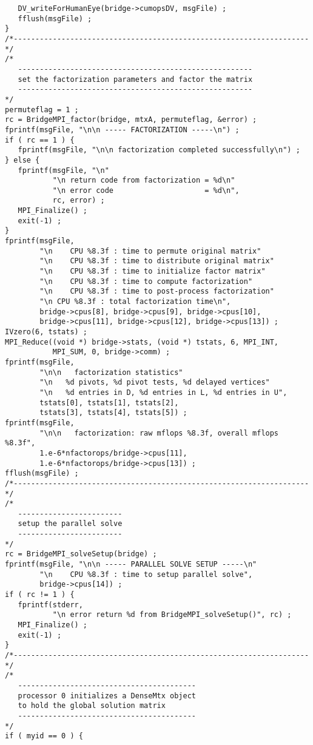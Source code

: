 \begin{verbatim}
   DV_writeForHumanEye(bridge->cumopsDV, msgFile) ;
   fflush(msgFile) ;
}
/*--------------------------------------------------------------------*/
/*
   ------------------------------------------------------
   set the factorization parameters and factor the matrix
   ------------------------------------------------------
*/
permuteflag = 1 ;
rc = BridgeMPI_factor(bridge, mtxA, permuteflag, &error) ;
fprintf(msgFile, "\n\n ----- FACTORIZATION -----\n") ;
if ( rc == 1 ) {
   fprintf(msgFile, "\n\n factorization completed successfully\n") ;
} else {
   fprintf(msgFile, "\n"
           "\n return code from factorization = %d\n"
           "\n error code                     = %d\n",
           rc, error) ;
   MPI_Finalize() ;
   exit(-1) ;
}
fprintf(msgFile, 
        "\n    CPU %8.3f : time to permute original matrix"
        "\n    CPU %8.3f : time to distribute original matrix" 
        "\n    CPU %8.3f : time to initialize factor matrix" 
        "\n    CPU %8.3f : time to compute factorization"
        "\n    CPU %8.3f : time to post-process factorization"
        "\n CPU %8.3f : total factorization time\n",
        bridge->cpus[8], bridge->cpus[9], bridge->cpus[10],
        bridge->cpus[11], bridge->cpus[12], bridge->cpus[13]) ;
IVzero(6, tstats) ;
MPI_Reduce((void *) bridge->stats, (void *) tstats, 6, MPI_INT,
           MPI_SUM, 0, bridge->comm) ;
fprintf(msgFile,
        "\n\n   factorization statistics"
        "\n   %d pivots, %d pivot tests, %d delayed vertices"
        "\n   %d entries in D, %d entries in L, %d entries in U",
        tstats[0], tstats[1], tstats[2], 
        tstats[3], tstats[4], tstats[5]) ;
fprintf(msgFile,
        "\n\n   factorization: raw mflops %8.3f, overall mflops %8.3f",
        1.e-6*nfactorops/bridge->cpus[11], 
        1.e-6*nfactorops/bridge->cpus[13]) ;
fflush(msgFile) ;
/*--------------------------------------------------------------------*/
/*
   ------------------------
   setup the parallel solve
   ------------------------
*/
rc = BridgeMPI_solveSetup(bridge) ;
fprintf(msgFile, "\n\n ----- PARALLEL SOLVE SETUP -----\n"
        "\n    CPU %8.3f : time to setup parallel solve", 
        bridge->cpus[14]) ;
if ( rc != 1 ) { 
   fprintf(stderr, 
           "\n error return %d from BridgeMPI_solveSetup()", rc) ;
   MPI_Finalize() ;
   exit(-1) ;
}
/*--------------------------------------------------------------------*/
/*
   -----------------------------------------
   processor 0 initializes a DenseMtx object 
   to hold the global solution matrix
   -----------------------------------------
*/
if ( myid == 0 ) {

\end{verbatim}
